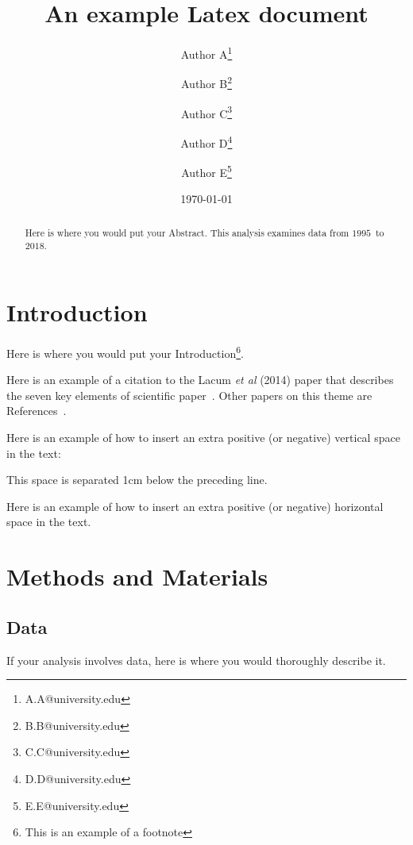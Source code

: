 \documentclass[12pt]{article}
\title{An example Latex document}
\author[1]{Author A\thanks{A.A@university.edu}}
\author[1]{Author B\thanks{B.B@university.edu}}
\author[1]{Author C\thanks{C.C@university.edu}}
\author[2]{Author D\thanks{D.D@university.edu}}
\author[2]{Author E\thanks{E.E@university.edu}}
\affil[1]{Department of Computer Science, \LaTeX\ University}
\affil[2]{Department of Mechanical Engineering, \LaTeX\ University}
\date{\today}
\newcommand{\yearmin}{$1995$}
\newcommand{\yearmax}{$2018$}
\begin{document}
\maketitle

\begin{abstract}
Here is where you would put your Abstract.
This analysis examines data from \yearmin\ to \yearmax.

\end{abstract}
\pagebreak

\section{Introduction}

Here is where you would put your Introduction\footnote{This is an example of a footnote}.

Here is an example of a citation to the Lacum {\it et al} (2014) paper
that describes the seven key elements
of scientific paper~\cite{lacum2014teaching}.
Other papers on this theme are References~\cite{van2016scientific,seiradakis2018training}.

Here is an example of how to insert an extra positive (or negative)
vertical space in the text:
\vspace*{1cm}

This space is separated 1cm below the preceding line.

Here is an example of how to insert an extra positive (or negative) horizontal \hspace*{1cm} space in the text.


\section{Methods and Materials}
\subsection{Data}

If your analysis involves data, here is where you would thoroughly describe it.
\end{document}
